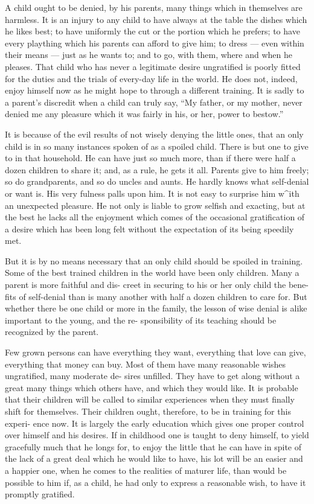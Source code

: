 \documentclass[
]{book}
\begin{document}
A child ought to be denied, by his parents, many things which in themselves are harmless. It is an injury to any child to have always at the table the dishes which he likes best; to have uniformly the cut or the portion which he prefers; to have every plaything which his parents can afford to give him; to dress --- even within their means --- just as he wants to; and to go, with them, where and when he pleases. That child who has never a legitimate desire ungratified is poorly fitted for the duties and the trials of every-day life in the world. He does not, indeed, enjoy himself now as he might hope to through a different training. It is sadly to a parent's discredit when a child can truly say, ``My father, or my mother, never denied me any pleasure which it was fairly in his, or her, power to bestow.''

It is because of the evil results of not wisely denying the little ones, that an only child is in so many instances spoken of as a spoiled child. There is but one to give to in that household. He can have just so much more, than if there were half a dozen children to share it; and, as a rule, he gets it all. Parents give to him freely; so do grandparents, and so do uncles and aunts. He hardly knows what self-denial or want is. His very fulness palls upon him. It is not easy to surprise him w\^{}ith an unexpected pleasure. He not only is liable to grow selfish and exacting, but at the best he lacks all the enjoyment which comes of the occasional gratification of a desire which has been long felt without the expectation of its being speedily met.

But it is by no means necessary that an only child should be spoiled in training. Some of the best trained children in the world have been only children. Many a parent is more faithful and dis- creet in securing to his or her only child the bene- fits of self-denial than is many another with half a dozen children to care for. But whether there be one child or more in the family, the lesson of wise denial is alike important to the young, and the re- sponsibility of its teaching should be recognized by the parent.

Few grown persons can have everything they want, everything that love can give, everything that money can buy. Most of them have many reasonable wishes ungratified, many moderate de- sires unfilled. They have to get along without a great many things which others have, and which they would like. It is probable that their children will be called to similar experiences when they must finally shift for themselves. Their children ought, therefore, to be in training for this experi- ence now. It is largely the early education which gives one proper control over himself and his desires. If in childhood one is taught to deny himself, to yield gracefully much that he longs for, to enjoy the little that he can have in spite of the lack of a great deal which he would like to have, his lot will be an easier and a happier one, when he comes to the realities of maturer life, than would be possible to him if, as a child, he had only to express a reasonable wish, to have it promptly gratified.
\end{document}
